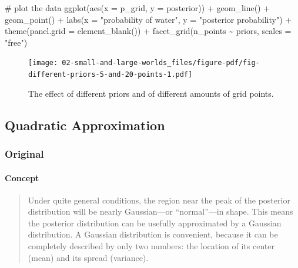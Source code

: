 \documentclass[
  letterpaper,
  DIV=11,
  numbers=noendperiod]{scrreprt}
\let\oldparagraph\paragraph
\renewcommand{\paragraph}[1]{\oldparagraph{#1}\mbox{}}
\newenvironment{Shaded}{\begin{snugshade}}{\end{snugshade}}
\newcommand{\AttributeTok}[1]{\textcolor[rgb]{0.40,0.45,0.13}{#1}}
\newcommand{\CommentTok}[1]{\textcolor[rgb]{0.37,0.37,0.37}{#1}}
\newcommand{\FunctionTok}[1]{\textcolor[rgb]{0.28,0.35,0.67}{#1}}
\newcommand{\InformationTok}[1]{\textcolor[rgb]{0.37,0.37,0.37}{#1}}
\newcommand{\NormalTok}[1]{\textcolor[rgb]{0.00,0.23,0.31}{#1}}
\newcommand{\SpecialCharTok}[1]{\textcolor[rgb]{0.37,0.37,0.37}{#1}}
\newcommand{\StringTok}[1]{\textcolor[rgb]{0.13,0.47,0.30}{#1}}
\begin{document}
\begin{Shaded}
\begin{Highlighting}[]
  \CommentTok{\# plot the data}
  \FunctionTok{ggplot}\NormalTok{(}\FunctionTok{aes}\NormalTok{(}\AttributeTok{x =}\NormalTok{ p\_grid, }\AttributeTok{y =}\NormalTok{ posterior)) }\SpecialCharTok{+}
  \FunctionTok{geom\_line}\NormalTok{() }\SpecialCharTok{+}
  \FunctionTok{geom\_point}\NormalTok{() }\SpecialCharTok{+}
  \FunctionTok{labs}\NormalTok{(}\AttributeTok{x =} \StringTok{"probability of water"}\NormalTok{,}
       \AttributeTok{y =} \StringTok{"posterior probability"}\NormalTok{) }\SpecialCharTok{+}
  \FunctionTok{theme}\NormalTok{(}\AttributeTok{panel.grid =} \FunctionTok{element\_blank}\NormalTok{()) }\SpecialCharTok{+}
  \FunctionTok{facet\_grid}\NormalTok{(n\_points }\SpecialCharTok{\textasciitilde{}}\NormalTok{ priors, }\AttributeTok{scales =} \StringTok{"free"}\NormalTok{)}
\InformationTok{\textasciigrave{}\textasciigrave{}\textasciigrave{}}
\end{Highlighting}
\end{Shaded}

\begin{figure}[H]

{\centering \texttt{[image: 02-small-and-large-worlds\_files/figure-pdf/fig-different-priors-5-and-20-points-1.pdf]}

}

\caption{\label{fig-different-priors-5-and-20-points}The effect of
different priors and of different amounts of grid points.}

\end{figure}

\hypertarget{quadratic-approximation}{%
\subsection{Quadratic Approximation}\label{quadratic-approximation}}

\hypertarget{original-7}{%
\subsubsection{Original}\label{original-7}}

\hypertarget{concept}{%
\paragraph{Concept}\label{concept}}

\begin{quote}
Under quite general conditions, the region near the peak of the
posterior distribution will be nearly Gaussian---or ``normal''---in
shape. This means the posterior distribution can be usefully
approximated by a Gaussian distribution. A Gaussian distribution is
convenient, because it can be completely described by only two numbers:
the location of its center (mean) and its spread (variance).
\end{quote}
\end{document}
